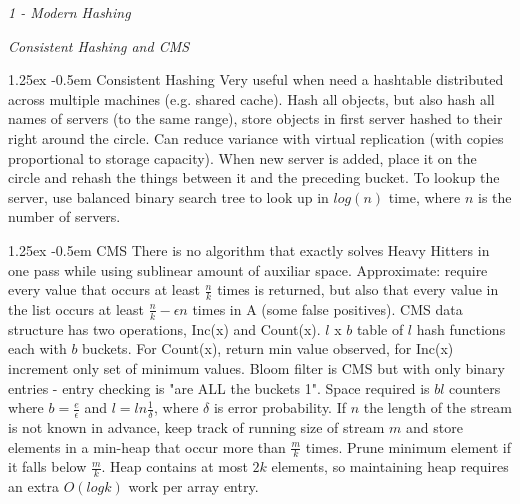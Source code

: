 \documentclass[8pt]{article}
\date{}
\makeatletter
\newlength{\norm}
\newlength{\nrm}
\renewcommand{\paragraph}{%
  \@startsection{paragraph}{4}%
  {\z@}{1.25ex \@plus 2pt \@minus 2pt}{-0.5em}%
  {\fontsize{\f@size}{\nrm}\normalfont\bfseries}%
}
\makeatother
\begin{document}
{\fontsize{\norm}{\nrm}\selectfont\raggedright{}
\setlength{\parskip}{0cm plus1pt minus1pt}

\def\sec#1{{\vspace{0.15cm}\fontsize{7pt}{8pt}\emph{#1}\par}}

\begin{multicols*}{5}

%
%
%

  \newcommand{\RR}{\mathbb{R}}
  \newcommand{\EE}{\mathbf{E}}
  \newcommand{\Var}{\text{Var}}

  \def\P{\paragraph}

  \sec{1 - Modern Hashing}

  \sec{Consistent Hashing and CMS}

  \paragraph{Consistent Hashing} Very useful when need a hashtable distributed across multiple machines (e.g. shared cache). Hash all objects, but also hash all names of servers (to the same range), store objects in first server hashed to their right around the circle. Can reduce variance with virtual replication (with copies proportional to storage capacity). When new server is added, place it on the circle and rehash the things between it and the preceding bucket. To lookup the server, use balanced binary search tree to look up in $log(n)$ time, where $n$ is the number of servers.

\paragraph{CMS} There is no algorithm that exactly solves Heavy Hitters in one pass while using sublinear amount of auxiliar space. Approximate: require every value that occurs at least $\frac{n}{k}$ times is returned, but also that every value in the list occurs at least $\frac{n}{k} - \epsilon n$ times in A (some false positives). CMS data structure has two operations, Inc(x) and Count(x). $l$ x $b$ table of $l$ hash functions each with $b$ buckets. For Count(x), return min value observed, for Inc(x) increment only set of minimum values. Bloom filter is CMS but with only binary entries - entry checking is "are ALL the buckets 1". Space required is $bl$ counters where $b = \frac{e}{\epsilon}$ and $l = ln\frac{1}{\delta}$, where $\delta$ is error probability. If $n$ the length of the stream is not known in advance, keep track of running size of stream $m$ and store elements in a min-heap that occur more than $\frac{m}{k}$ times. Prune minimum element if it falls below $\frac{m}{k}$. Heap contains at most $2k$ elements, so maintaining heap requires an extra $O(logk)$ work per array entry.


\end{multicols*}}
\end{document}
